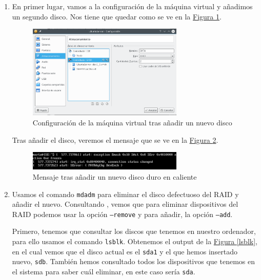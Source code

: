 \documentclass[10pt,a4paper,spanish]{article}
\numberwithin{equation}{section} %
\numberwithin{figure}{section} %
\numberwithin{table}{section} %
\begin{document}
\begin{enumerate}[1.]
    \item En primer lugar, vamos a la configuración de la máquina virtual y añadimos un segundo disco. Nos tiene que quedar como se ve en la \hyperref[newdisk]{Figura \ref*{newdisk}}.

    \begin{figure}[!h]
    \centering
    \includegraphics[width=0.7\textwidth]{3_3}
    \caption{Configuración de la máquina virtual tras añadir un nuevo disco}
    \label{newdisk}
    \end{figure}

    Tras añadir el disco, veremos el mensaje que se ve en la \hyperref[mensaje]{Figura \ref*{mensaje}}.
    \begin{figure}[!h]
        \centering
        \includegraphics[width=0.7\textwidth]{3_4}
        \caption{Mensaje tras añadir un nuevo disco duro en caliente}
        \label{mensaje}
    \end{figure}

    \item Usamos el comando \texttt{mdadm} para eliminar el disco defectuoso del RAID y añadir el nuevo. Consultando \cite{mdadm}, vemos que para eliminar dispositivos del RAID podemos usar la opción \texttt{--remove} y para añadir, la opción \texttt{--add}.

    Primero, tenemos que consultar los discos que tenemos en nuestro ordenador, para ello usamos el comando \texttt{lsblk}. Obtenemos el output de la \hyperref[lsblk]{Figura \ref*{lsblk}}, en el cual vemos que el disco actual es el \texttt{sda1} y el que hemos insertado nuevo, \texttt{sdb}. También hemos consultado todos los dispositivos que tenemos en el sistema para saber cuál eliminar, en este caso sería \texttt{sda}.


\end{enumerate}
\end{document}
